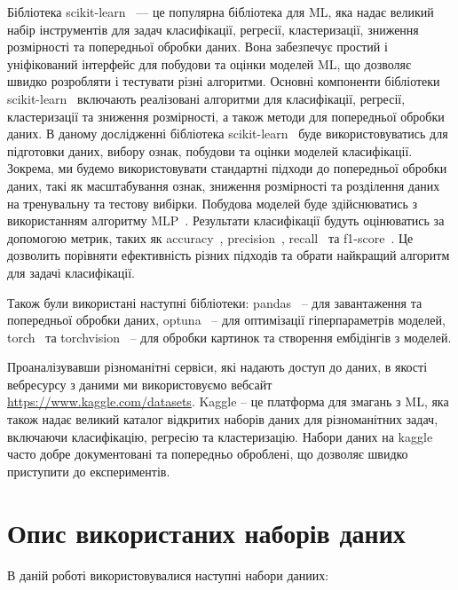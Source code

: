 Бібліотека scikit-learn~\cite{ct20} --- це популярна бібліотека для ML, яка надає великий набір інструментів для задач класифікації, регресії, кластеризації, зниження розмірності та попередньої обробки даних. Вона забезпечує простий і уніфікований інтерфейс для побудови та оцінки моделей ML, що дозволяє швидко розробляти і тестувати різні алгоритми. Основні компоненти бібліотеки scikit-learn~\cite{ct20} включають реалізовані алгоритми для класифікації, регресії, кластеризації та зниження розмірності, а також методи для попередньої обробки даних. В даному дослідженні бібліотека scikit-learn~\cite{ct20} буде використовуватись для підготовки даних, вибору ознак, побудови та оцінки моделей класифікації. Зокрема, ми будемо використовувати стандартні підходи до попередньої обробки даних, такі як масштабування ознак, зниження розмірності та розділення даних на тренувальну та тестову вибірки. Побудова моделей буде здійснюватись з використанням алгоритму MLP~\cite{ct26}. Результати класифікації будуть оцінюватись за допомогою метрик, таких як accuracy~\cite{ct6}, precision~\cite{ct6}, recall~\cite{ct7} та f1-score~\cite{ct8}. Це дозволить порівняти ефективність різних підходів та обрати найкращий алгоритм для задачі класифікації.

Також були використані наступні бібліотеки: pandas~\cite{ct21} -- для завантаження та попередньої обробки даних, optuna~\cite{ct22} -- для оптимізації гіперпараметрів моделей, torch~\cite{ct23} та torchvision~\cite{ct24} -- для обробки картинок та створення ембідінгів з моделей.

Проаналізувавши різноманітні сервіси, які надають доступ до даних, в якості вебресурсу з даними ми використовуємо вебсайт \href{https://www.kaggle.com/datasets}{https://www.kaggle.com/datasets}. Kaggle -- це платформа для змагань з ML, яка також надає великий каталог відкритих наборів даних для різноманітних задач, включаючи класифікацію, регресію та кластеризацію. Набори даних на kaggle часто добре документовані та попередньо оброблені, що дозволяє швидко приступити до експериментів.

\section{Опис використаних наборів даних} \label{sec:data-description}

В даній роботі використовувалися наступні набори даниих: 

